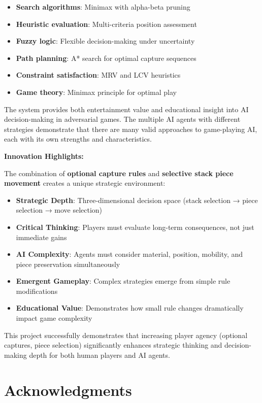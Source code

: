 \documentclass[12pt,a4paper]{article}
\begin{document}
\begin{itemize}
    \item \textbf{Search algorithms}: Minimax with alpha-beta pruning
    \item \textbf{Heuristic evaluation}: Multi-criteria position assessment
    \item \textbf{Fuzzy logic}: Flexible decision-making under uncertainty
    \item \textbf{Path planning}: A* search for optimal capture sequences
    \item \textbf{Constraint satisfaction}: MRV and LCV heuristics
    \item \textbf{Game theory}: Minimax principle for optimal play
\end{itemize}

The system provides both entertainment value and educational insight into AI decision-making in adversarial games. The multiple AI agents with different strategies demonstrate that there are many valid approaches to game-playing AI, each with its own strengths and characteristics.

\textbf{Innovation Highlights:}

The combination of \textbf{optional capture rules} and \textbf{selective stack piece movement} creates a unique strategic environment:
\begin{itemize}
    \item \textbf{Strategic Depth}: Three-dimensional decision space (stack selection → piece selection → move selection)
    \item \textbf{Critical Thinking}: Players must evaluate long-term consequences, not just immediate gains
    \item \textbf{AI Complexity}: Agents must consider material, position, mobility, and piece preservation simultaneously
    \item \textbf{Emergent Gameplay}: Complex strategies emerge from simple rule modifications
    \item \textbf{Educational Value}: Demonstrates how small rule changes dramatically impact game complexity
\end{itemize}

This project successfully demonstrates that increasing player agency (optional captures, piece selection) significantly enhances strategic thinking and decision-making depth for both human players and AI agents.

\section*{Acknowledgments}
\end{document}
